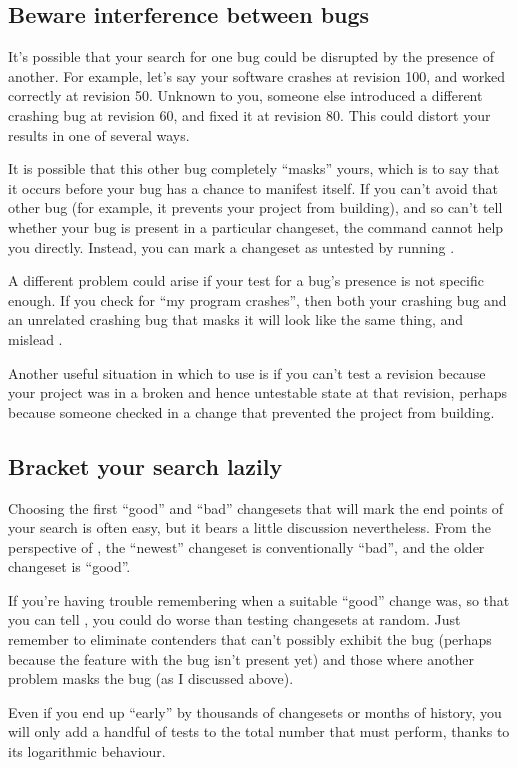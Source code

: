 \subsection{Beware interference between bugs}

It's possible that your search for one bug could be disrupted by the
presence of another.  For example, let's say your software crashes at
revision 100, and worked correctly at revision 50.  Unknown to you,
someone else introduced a different crashing bug at revision 60, and
fixed it at revision 80.  This could distort your results in one of
several ways.

It is possible that this other bug completely ``masks'' yours, which
is to say that it occurs before your bug has a chance to manifest
itself.  If you can't avoid that other bug (for example, it prevents
your project from building), and so can't tell whether your bug is
present in a particular changeset, the  command cannot
help you directly.  Instead, you can mark a changeset as untested by
running .

A different problem could arise if your test for a bug's presence is
not specific enough.  If you check for ``my program crashes'', then
both your crashing bug and an unrelated crashing bug that masks it
will look like the same thing, and mislead .

Another useful situation in which to use  is
if you can't test a revision because your project was in a broken and
hence untestable state at that revision, perhaps because someone
checked in a change that prevented the project from building.

\subsection{Bracket your search lazily}

Choosing the first ``good'' and ``bad'' changesets that will mark the
end points of your search is often easy, but it bears a little
discussion nevertheless.  From the perspective of , the
``newest'' changeset is conventionally ``bad'', and the older
changeset is ``good''.

If you're having trouble remembering when a suitable ``good'' change
was, so that you can tell , you could do worse than
testing changesets at random.  Just remember to eliminate contenders
that can't possibly exhibit the bug (perhaps because the feature with
the bug isn't present yet) and those where another problem masks the
bug (as I discussed above).

Even if you end up ``early'' by thousands of changesets or months of
history, you will only add a handful of tests to the total number that
 must perform, thanks to its logarithmic behaviour.

